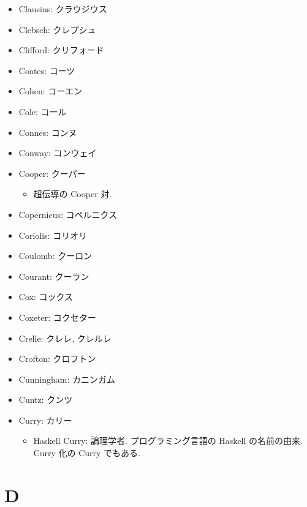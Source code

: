 \documentclass[openany, a4paper, oneside]{jsbook}
\begin{document}
\begin{itemize}
\item Clausius: クラウジウス
\item Clebsch: クレプシュ
\item Clifford: クリフォード
\item Coates: コーツ
\item Cohen: コーエン
\item Cole: コール
\item Connes: コンヌ
\item Conway: コンウェイ
\item Cooper: クーパー
\begin{itemize}
\item 超伝導の Cooper 対.
\end{itemize}
\item Copernicus: コペルニクス
\item Coriolis: コリオリ
\item Coulomb: クーロン
\item Courant: クーラン
\item Cox: コックス
\item Coxeter: コクセター
\item Crelle: クレレ, クレルレ
\item Crofton: クロフトン
\item Cunningham: カニンガム
\item Cuntz: クンツ
\item Curry: カリー
\begin{itemize}
\item Haskell Curry: 論理学者. プログラミング言語の Haskell の名前の由来. Curry 化の Curry でもある.
\end{itemize}
\end{itemize}
\section{D}
\end{document}
